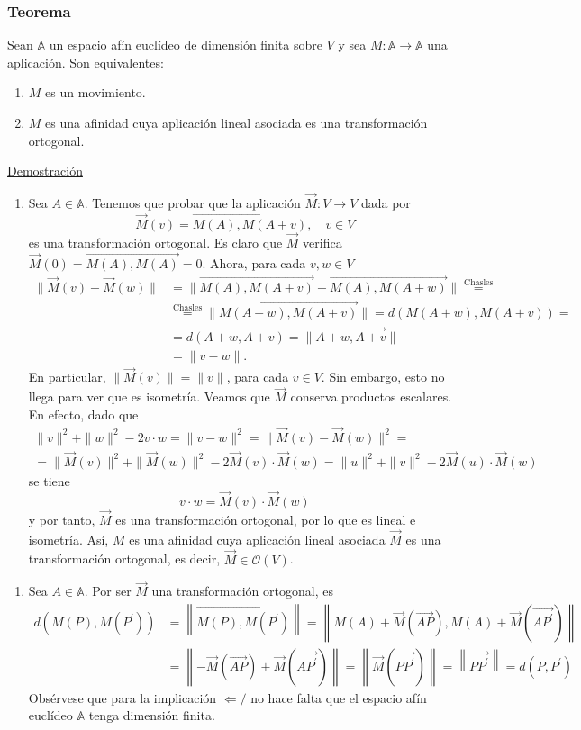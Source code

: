 \documentclass[12pt, a4paper, ones, notitlepage, openany,titlepage]{article}
\newcommand{\dobleimplicacion}[2]{
	\begin{enumerate}[label=$\Rightarrow/$]
		\item #1
	\end{enumerate}
	\begin{enumerate}[label=$\Leftarrow/$]
		\item #2
	\end{enumerate}
}
\newcommand{\demostracion}{\noindent\underline{Demostración}}
\begin{document}
\subsubsection{Teorema}
Sean $\mathbb{A}$ un espacio afín euclídeo de dimensión finita sobre $V$ y sea $M: \mathbb{A} \rightarrow \mathbb{A}$ una aplicación. Son equivalentes:
\begin{enumerate}[label=(\arabic*)]
\item $M$ es un movimiento.

\item $M$ es una afinidad cuya aplicación lineal asociada es una transformación ortogonal.
\end{enumerate}
\demostracion
\dobleimplicacion{
	Sea $A \in \mathbb{A}$. Tenemos que probar que la aplicación $\vec{M}: V \rightarrow V$ dada por
	$$
	\vec{M}(v)=\overrightarrow{M(A),M(A+v)}, \quad v \in V
	$$
	es una transformación ortogonal. Es claro que $\vec{M}$ verifica $\vec{M}(0) = \overrightarrow{M(A),M(A)} = 0$. Ahora, para cada $v, w \in V$
	$$
	\begin{aligned}
		\|\vec{M}(v)-\vec{M}(w)\| & =\|\overrightarrow{M(A), M(A+v)}-\overrightarrow{M(A), M(A+w)}\|\stackrel{\text{Chasles}}{=} \\ & \stackrel{\text{Chasles}}{=} \|\overrightarrow{M(A+w), M(A+v)}\| =d(M(A+w), M(A+v)) = \\ & = d(A+w, A+v)=\|\overrightarrow{A+w, A+v}\| \\
		& =\|v-w\| .
	\end{aligned}
	$$
	En particular, $\|\vec{M}(v)\|=\|v\|$, para cada $v \in V$. Sin embargo, esto no llega para ver que es isometría. Veamos que $\vec{M}$ conserva productos escalares. En efecto, dado que
	\begin{gather*}
	\|v\|^{2}+\|w\|^{2}-2 v \cdot w=\|v-w\|^{2}=\|\vec{M}(v)-\vec{M}(w)\|^{2}=\\ =\|\vec{M}(v)\|^{2}+\|\vec{M}(w)\|^{2}-2 \vec{M}(v) \cdot \vec{M}(w) = \|u\|^2 + \|v\|^2 - 2 \vec{M}(u) \cdot \vec{M}(w)
	\end{gather*}
	se tiene
	$$
	v \cdot w=\vec{M}(v) \cdot \vec{M}(w)
	$$
	y por tanto, $\vec{M}$ es una transformación ortogonal, por lo que es lineal e isometría. Así, $M$ es una afinidad cuya aplicación lineal asociada $\vec{M}$ es una transformación ortogonal, es decir, $\vec{M} \in \mathcal{O}(V)$.
}{
	Sea $A \in \mathbb{A}$. Por ser $\vec{M}$ una transformación ortogonal, es
	$$
	\begin{aligned}
		d\left(M(P), M\left(P^{\prime}\right)\right) & =\left\|\overrightarrow{M(P), M\left(P^{\prime}\right)}\right\|=\left\|M(A)+\vec{M}(\overrightarrow{A P}), M(A)+\vec{M}\left(\overrightarrow{A P^{\prime}}\right)\right\| \\
		& =\left\|-\vec{M}(\overrightarrow{A P})+\vec{M}\left(\overrightarrow{A P^{\prime}}\right)\right\|=\left\|\vec{M}\left(\overrightarrow{P P^{\prime}}\right)\right\|=\left\|\overrightarrow{P P^{\prime}}\right\|=d\left(P, P^{\prime}\right)
	\end{aligned}
	$$
	Obsérvese que para la implicación $\Leftarrow/$ no hace falta que el espacio afín euclídeo $\mathbb{A}$ tenga dimensión finita.
}
\end{document}
